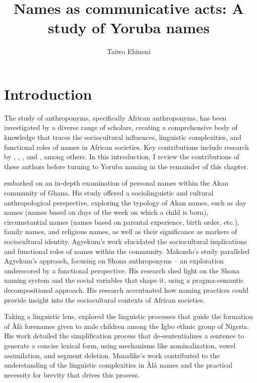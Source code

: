 \documentclass[output=paper,colorlinks,citecolor=brown]{langscibook}
\author{Taiwo Ehineni\affiliation{Harvard University}}
\title{Names as communicative acts: A study of Yoruba names}
\begin{document}
\maketitle

\section{Introduction}

The study of anthroponyms, specifically African anthroponyms, has been investigated by a diverse range of scholars, creating a comprehensive body of knowledge that traces the sociocultural influences, linguistic complexities, and functional roles of names in African societies. Key contributions include research by \citet{Agyekum2006Sociolinguistics}, \citet{Makondo2009}, \citet{Mmadike2014}, and \citet{Obeng1997, Obeng1998, Obeng1999, Obeng2001}, among others. In this introduction, I review the contributions of these authors before turning to Yoruba naming in the remainder of this chapter.
 
\citet{Agyekum2006Sociolinguistics} embarked on an in-depth examination of personal names within the Akan community of Ghana. His study offered a sociolinguistic and cultural anthropological perspective, exploring the typology of Akan names, such as day names (names based on days of the week on which a child is born), circumstantial names (names based on parental experience, birth order, etc.), family names, and religious names, as well as their significance as markers of sociocultural identity. Agyekum's work elucidated the sociocultural implications and functional roles of names within the  community. Makondo's study \citeyearpar{Makondo2009} paralleled Agyekum's approach, focusing on Shona anthroponyms -- an exploration underscored by a functional perspective. His research shed light on the Shona naming system and the social variables that shape it, using a pragma-semantic decompositional approach. His research accentuated how naming practices could provide insight into the sociocultural contexts of African societies.

Taking a linguistic lens, \citet{Mmadike2014} explored the linguistic processes that guide the formation of Àlà forenames given to male children among the Igbo ethnic group of Nigeria. His work detailed the simplification process that de-sententializes a sentence to generate a concise lexical form, using mechanisms like nominalization, vowel assimilation, and segment deletion. Mmadike's work contributed to the understanding of the linguistic complexities in Àlà names and the practical necessity for brevity that drives this process.
\end{document}
